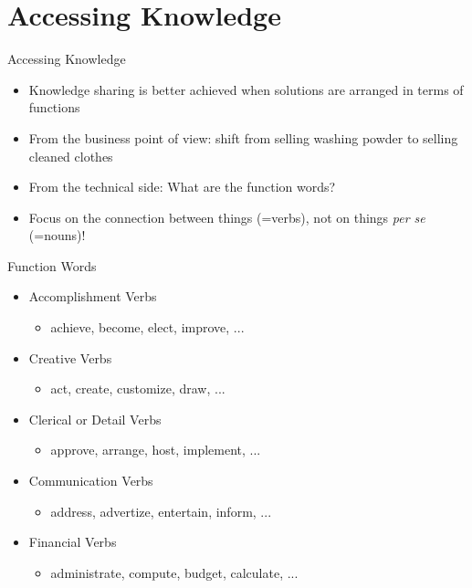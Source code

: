 \documentclass{beamer}
\begin{document}
	\section{Accessing Knowledge}   
	\begin{frame}{Accessing Knowledge}
        \begin{itemize}
				\item Knowledge sharing is better achieved when solutions are arranged in terms of functions
				\item From the business point of view: shift from selling washing powder to selling cleaned clothes
				\item From the technical side: What are the function words?
				\item Focus on the connection between things (=verbs), not on things \emph{per se} (=nouns)!
			\end{itemize}

	\end{frame}

	\begin{frame}{Function Words}
	\begin{itemize}
			\item Accomplishment Verbs
				\begin{itemize}
					\item achieve, become, elect, improve, ...
				\end{itemize}
			\item Creative Verbs
			    \begin{itemize}
					\item act, create, customize, draw, ...
				\end{itemize}
			\item Clerical or Detail Verbs
				\begin{itemize}
					\item approve, arrange, host, implement, ...
				\end{itemize}
			\item Communication Verbs
			    \begin{itemize}
					\item address, advertize, entertain, inform, ...
				\end{itemize}
			\item Financial Verbs
				\begin{itemize}
					\item administrate, compute, budget, calculate, ...
				\end{itemize}
	\end{itemize}
	\end{frame}
	
\end{document}
